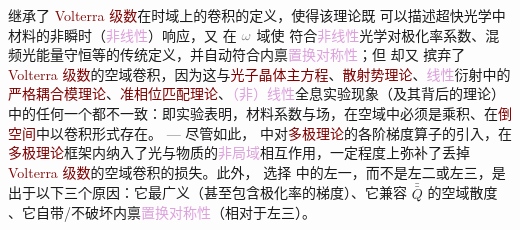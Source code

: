  继承了 \textcolor{Maroon}{Volterra 级数}在时域上的卷积的定义，使得该理论既 {\one} 可以描述超快光学中材料的非瞬时（\textcolor{Plum}{非线性}）响应，又 {\two} 在 $\mathcolor{gray}{\omega}$ 域使  符合\textcolor{Plum}{非线性}光学对极化率系数、混频光能量守恒等的传统定义，并自动符合内禀\textcolor{Plum}{置换对称性}；但  却又 {\three} 摈弃了 \textcolor{Maroon}{Volterra 级数}的空域卷积，因为这与\textcolor{Maroon}{光子晶体主方程}\cite{sakodaOpticalPropertiesPhotonic2005,joannopoulosPhotonicCrystalsMolding2008}、\textcolor{Maroon}{散射势理论}\cite{PrinciplesOptics7th,gerkeAperiodicVolumeOptics2010}、\textcolor{Plum}{线性}衍射中的\textcolor{Maroon}{严格耦合模理论}\cite{moharamRigorousCoupledwaveAnalysis1981,ZhuBangTaoGeXiangYiXingZhouQiXingJieGourcwaSuanFaJiBingXingJiSuanJiaSu2016}、\textcolor{Maroon}{准相位匹配理论}\cite{arieQuasiPhaseMatching2007a,zhangUniversalModelingSecondorder2018,chenQuasiphasematchingdivisionMultiplexingHolography2021b,chenLaserNanoprinting3D2023}、\textcolor{Plum}{（非）线性}全息实验现象（及其背后的理论）\cite{zhangNonlinearPhotonicCrystals2021,chenQuasiphasematchingdivisionMultiplexingHolography2021b,chenLaserNanoprinting3D2023,gerkeAperiodicVolumeOptics2010}中的任何一个都不一致：即实验表明，材料系数与场，在空域中必须是乘积、在\textcolor{Maroon}{倒空间}中以卷积形式存在。 ---  尽管如此，{\four}  中对\textcolor{Maroon}{多极理论}的各阶梯度算子的引入，在\textcolor{Maroon}{多极理论}框架内纳入了光与物质的\textcolor{Plum}{非局域}相互作用，一定程度上弥补了丢掉 \textcolor{Maroon}{Volterra 级数}的空域卷积的损失。此外，{\five} 选择  中的左一，而不是左二或左三，是出于以下三个原因：它最广义（甚至包含极化率的梯度）、它兼容 $\bar{\bar{Q}}$ 的空域散度 、它自带/不破坏内禀\textcolor{Plum}{置换对称性}（相对于左三）。

